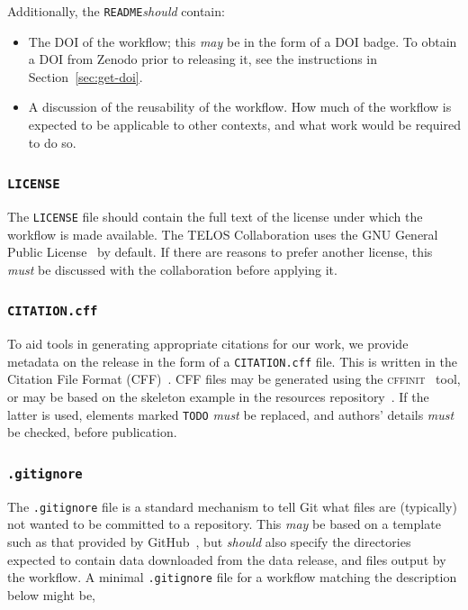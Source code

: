 \documentclass{article}
\newcommand\rfcword[1]{\emph{#1}\xspace}
\newcommand\must{\rfcword{must}}
\newcommand\should{\rfcword{should}}
\newcommand\may{\rfcword{may}}
\newcommand\filename[1]{\texttt{#1}\xspace}
\newcommand\readme{\filename{README}}
\newcommand\program[1]{\textsc{#1}\xspace}
\begin{document}
Additionally,
the \readme \should contain:

\begin{itemize}
  \item
        The DOI of the workflow;
        this \may be in the form of a DOI badge.
        To obtain a DOI from Zenodo prior to releasing it,
        see the instructions in Section~\ref{sec:get-doi}.
  \item
        A discussion of the reusability of the workflow.
        How much of the workflow is expected to be applicable to other contexts,
        and what work would be required to do so.
\end{itemize}

\subsubsection{\filename{LICENSE}}

The \filename{LICENSE} file should contain
the full text of the license under which the workflow is made available.
The TELOS Collaboration uses the GNU General Public License~\cite{gpl} by default.
If there are reasons to prefer another license,
this \must be discussed with the collaboration before applying it.

\subsubsection{\filename{CITATION.cff}}

To aid tools in generating appropriate citations for our work,
we provide metadata on the release in the form of a \filename{CITATION.cff} file.
This is written in the Citation File Format (CFF)~\cite{cff}.
CFF files may be generated using the \program{cffinit}~\cite{cffinit} tool,
or may be based on the skeleton example in the resources repository~\cite{resources}.
If the latter is used,
elements marked \verb|TODO| \must be replaced,
and authors' details \must be checked,
before publication.

\subsubsection{\filename{.gitignore}}

The \filename{.gitignore} file is a standard mechanism to tell Git
what files are
(typically)
not wanted to be committed to a repository.
This \may be based on a template such as that provided by GitHub~\cite{gitignore-python},
but \should also specify the directories expected to contain
data downloaded from the data release,
and files output by the workflow.
A minimal \filename{.gitignore} file for a workflow matching the description below might be,
\end{document}
